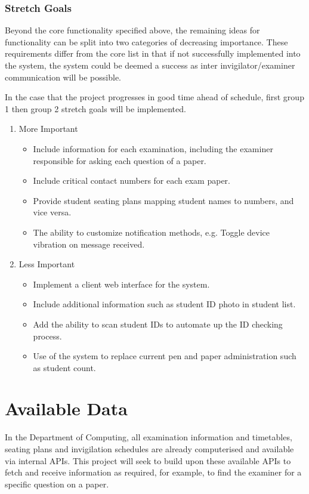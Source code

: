 \documentclass[a4paper, 12pt, notitlepage]{report}
\begin{document}
\subsubsection{Stretch Goals}

Beyond the core functionality specified above, the remaining ideas for functionality can be split into two categories of decreasing importance.  These requirements differ from the core list in that if not successfully implemented into the system, the system could be deemed a success as inter invigilator/examiner communication will be possible.

In the case that the project progresses in good time ahead of schedule, first group 1 then group 2 stretch goals will be implemented.

\begin{enumerate}
\item More Important
\begin{itemize}
\item Include information for each examination, including the examiner responsible for asking each question of a paper.
\item Include critical contact numbers for each exam paper.
\item Provide student seating plans mapping student names to numbers, and vice versa.
\item The ability to customize notification methods, e.g. Toggle device vibration on message received.
\end{itemize}

\item Less Important

\begin{itemize}
\item Implement a client web interface for the system.
\item Include additional information such as student ID photo in student list.
\item Add the ability to scan student IDs to automate up the ID checking process.
\item Use of the system to replace current pen and paper administration such as student count.
\end{itemize}
\end{enumerate}

\section{Available Data}

In the Department of Computing, all examination information and timetables, seating plans and invigilation schedules are already computerised and available via internal APIs.  This project will seek to build upon these available APIs to fetch and receive information as required, for example, to find the examiner for a specific question on a paper.
\end{document}
